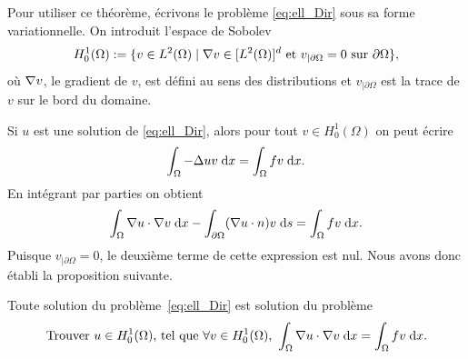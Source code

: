 \documentclass[12pt,a4paper,twoside]{article}
\begin{document}

Pour utiliser ce th\'eor\`eme, \'ecrivons le probl\`eme \eqref{eq:ell_Dir} sous
sa forme variationnelle.
On introduit l'espace de Sobolev
\begin{align}
  H_0^1(\Omega) := \{ v \in L^2(\Omega) \; | \; \nabla v \in [L^2(\Omega)]^d
  \text{ et } v_{| \partial \Omega} = 0 \text{ sur } \partial \Omega \} ,
\end{align}
o\`u $\nabla v$, le gradient de $v$, est d\'efini au sens des distributions et $v_{|\partial \Omega}$
est la trace de $v$ sur le bord du domaine.


Si $u$ est une solution de \eqref{eq:ell_Dir}, alors pour tout $v \in H^1_0(\Omega)$
on peut \'ecrire
\begin{align*}
  \int_{\Omega} - \Delta u v \;\mathrm{d} x = \int_{\Omega} f v \;\mathrm{d} x .
\end{align*}
En int\'egrant par parties on obtient 
\begin{align*}
  \int_{\Omega} \nabla u \cdot \nabla v \;\mathrm{d} x 
  - \int_{\partial \Omega} (\nabla u \cdot n) v \;\mathrm{d} s = \int_{\Omega} f v \;\mathrm{d} x .
\end{align*}
Puisque $v_{|\partial \Omega} = 0$, le deuxi\`eme terme de cette expression est nul.
Nous avons donc \'etabli la proposition suivante.
\begin{proposition}
  Toute solution du probl\`eme~\eqref{eq:ell_Dir} est solution du probl\`eme 
  \begin{equation}
    \label{eq:LM2}
    \text{Trouver $u \in H_0^1(\Omega)$, tel que $\forall v \in H_0^1(\Omega)$, } 
    \int_{\Omega} \nabla u \cdot \nabla v \;\mathrm{d} x = \int_{\Omega} f v \;\mathrm{d} x .
  \end{equation}
\end{proposition}
\end{document}
